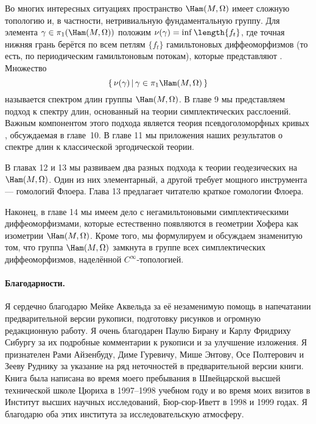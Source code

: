 Во многих интересных ситуациях пространство $\Ham(M,\Omega)$ имеет сложную топологию и, в частности, нетривиальную фундаментальную группу.
Для элемента $\gamma\in\pi_1(\Ham(M,\Omega))$ положим $\nu(\gamma) \z= \inf \length \{f_t\}$, где
точная нижняя грань берётся по всем петлям $\{f_t\}$ гамильтоновых
диффеоморфизмов (то есть, по периодическим гамильтоновым потокам),
которые представляют  .
Множество
\[\set{\nu(\gamma)}{\gamma\in\pi_{1}\Ham(M,\Omega)}\]
называется спектром длин группы $\Ham(M,\Omega)$.
В главе 9 мы представляем подход к спектру длин, основанный на теории симплектических расслоений.
Важным компонентом этого подхода является теория  псевдоголоморфных кривых , обсуждаемая в главе~10.
В главе 11 мы  приложения наших результатов о спектре длин к классической эргодической теории.

В главах 12 и 13 мы развиваем два разных подхода к теории геодезических на $\Ham(M,\Omega)$.
Один из них элементарный, а другой требует мощного инструмента --- гомологий Флоера.
Глава 13 предлагает читателю краткое  гомологии Флоера.

Наконец, в главе 14 мы имеем дело с негамильтоновыми симплектическими диффеоморфизмами, которые естественно появляются в геометрии Хофера как изометрии $\Ham(M,\Omega)$.
Кроме того, мы формулируем и обсуждаем знаменитую 
 том, что группа $\Ham(M,\Omega)$ замкнута в группе всех симплектических диффеоморфизмов, наделённой $C^\infty$-топологией. 

\paragraph*{Благодарности.}
Я сердечно благодарю Мейке Аквельда за её незаменимую помощь в напечатании предварительной версии рукописи,
подготовку рисунков и огромную редакционную работу.
Я очень благодарен Паулю Бирану и Карлу Фридриху Сибургу за их подробные комментарии к рукописи и за улучшение изложения.
Я признателен Рами Айзенбуду, Диме Гуревичу, Мише Энтову, Осе Полтерович и Зееву Руднику за указание на ряд неточностей в предварительной версии книги.
Книга была написана во время моего пребывания в Швейцарской высшей технической школе Цюриха в 1997--1998 учебном году и во время моих визитов в Институт высших научных исследований, Бюр-сюр-Иветт в 1998 и 1999 годах.
Я благодарю оба этих института за  исследовательскую атмосферу. 
